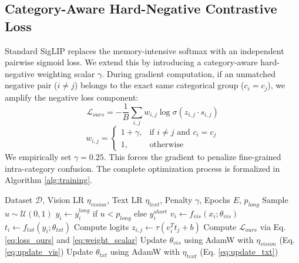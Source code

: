 \documentclass[conference]{IEEEtran}
\begin{document}
\subsection{Category-Aware Hard-Negative Contrastive Loss}
Standard SigLIP replaces the memory-intensive softmax with an independent pairwise sigmoid loss. We extend this by introducing a category-aware hard-negative weighting scalar $\gamma$. During gradient computation, if an unmatched negative pair ($i \neq j$) belongs to the exact same categorical group ($c_i = c_j$), we amplify the negative loss component:
\begin{equation}
    \mathcal{L}_{ours} = - \frac{1}{B} \sum_{i,j} w_{i,j} \log \sigma(z_{i,j} \cdot s_{i,j})
    \label{eq:loss_ours}
\end{equation}
\begin{equation}
w_{i,j} = \begin{cases} 1 + \gamma, & \text{if } i \neq j \text{ and } c_i = c_j \\ 1, & \text{otherwise} \end{cases}
\label{eq:weight_scalar}
\end{equation}
We empirically set $\gamma = 0.25$. This forces the gradient to penalize fine-grained intra-category confusion. The complete optimization process is formalized in Algorithm \ref{alg:training}.

\begin{algorithm}[htbp]
\caption{FashionVLM Training Loop}
\label{alg:training}
\begin{algorithmic}[1]
\REQUIRE Dataset $\mathcal{D}$, Vision LR $\eta_{vision}$, Text LR $\eta_{text}$, Penalty $\gamma$, Epochs $E$, $p_{long}$
        \STATE Sample $u \sim \mathcal{U}(0,1)$
        \STATE $y_i \leftarrow y_i^{long}$ if $u < p_{long}$ else $y_i^{short}$
        \STATE $v_i \leftarrow f_{vis}(x_i; \theta_{vis})$
        \STATE $t_i \leftarrow f_{txt}(y_i; \theta_{txt})$
        \STATE Compute logits $z_{i,j} \leftarrow \tau (v_i^T t_j + b)$
        \STATE Compute $\mathcal{L}_{ours}$ via Eq. \ref{eq:loss_ours} and \ref{eq:weight_scalar}
        \STATE Update $\theta_{vis}$ using AdamW with $\eta_{vision}$ (Eq. \ref{eq:update_vis})
        \STATE Update $\theta_{txt}$ using AdamW with $\eta_{text}$ (Eq. \ref{eq:update_txt})
    \ENDFOR
\ENDFOR
\end{algorithmic}
\end{algorithm}
\end{document}
